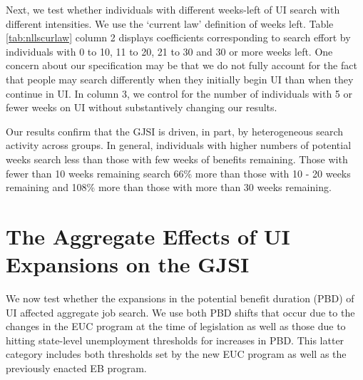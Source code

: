 \documentclass[12pt]{article}
\begin{document}
\begin{spacing}{2}
Next, we test whether individuals with different weeks-left of UI search with different intensities. We use the `current law' definition of weeks left. Table \ref{tab:nllscurlaw} column 2 displays coefficients corresponding to search effort by individuals with 0 to 10, 11 to 20, 21 to 30 and 30 or more weeks left. One concern about our specification may be that we do not fully account for the fact that people may search differently when they initially begin UI than when they continue in UI. In column 3, we control for the number of individuals with 5 or fewer weeks on UI without substantively changing our results.

Our results confirm that the GJSI is driven, in part, by heterogeneous search activity across groups. In general, individuals with higher numbers of potential weeks search less than those with few weeks of benefits remaining. Those with fewer than 10 weeks remaining search 66\% more than those with 10 - 20 weeks remaining and 108\% more than those with more than 30 weeks remaining.



\section{The Aggregate Effects of UI Expansions on the GJSI}
We now test whether the expansions in the potential benefit duration (PBD) of UI affected aggregate job search. We use both PBD shifts that occur due to the changes in the EUC program at the time of legislation as well as those due to hitting state-level unemployment thresholds for increases in PBD. This latter category includes both thresholds set by the new EUC program as well as the previously enacted EB program. 


\end{spacing}
\end{document}
